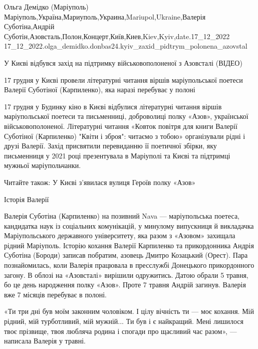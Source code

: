  
 
 
 
 

Ольга Демідко (Маріуполь)
Маріуполь,Україна,Мариуполь,Украина,Mariupol,Ukraine,Валерія Суботіна,Андрій Суботін,Азовсталь,Полон,Концерт,Київ,Киев,Kiev,Kyiv,date.17_12_2022
17_12_2022.olga_demidko.donbas24.kyiv_zaxid_pidtrym_polonena_azovstal

У Києві відбувся захід на підтримку військовополоненої з Азовсталі (ВІДЕО)

17 грудня у Києві провели літературні читання віршів маріупольської поетеси Валерії Суботіної
(Карпиленко), яка наразі перебуває у полоні

17 грудня у Будинку кіно в Києві відбулися літературні читання віршів
маріупольської поетеси та письменниці, доброволиці полку «Азов», української
військовополоненої. Літературні читання «Ковток повітря для книги Валерії
Суботіної (Карпиленко) "Квіти і зброя": читаємо з тобою» організували рідні і
друзі Валерії. Захід присвятили перевиданню її поетичної збірки, яку
письменниця у 2021 році презентувала в Маріуполі та Києві та підтримці мужньої
маріупольчанки.

Читайте також: У Києві з'явилася вулиця Героїв полку «Азов»

Історія Валерії

Валерія Суботіна (Карпиленко) на позивний Nava — маріупольська поетеса,
кандидатка наук із соціальних комунікацій, у минулому випускниця й викладачка
Маріупольського державного університету, яка разом з «Азовом» захищала рідний
Маріуполь. Історію кохання Валерії Карпиленко та прикордонника Андрія Суботіна
(Бороди) записав побратим, азовець Дмитро Козацький (Орест). Пара
познайомилась, коли Валерія працювала в пресслужбі Донецького прикордонного
загону. В облозі на «Азовсталі» вирішили одружитись. Датою обрали 5 травня, бо
це день народження полку «Азов». Проте 7 травня Андрій загинув. Валерія вже 7
місяців перебуває в полоні.

«Ти три дні був моїм законним чоловіком. І цілу вічність ти — моє кохання. Мій
рідний, мій турботливий, мій мужній... Ти був і є найкращий. Мені лишилося твоє
прізвище, твоя любляча родина і спогади про щасливий час разом», — написала
Валерія у травні. 

